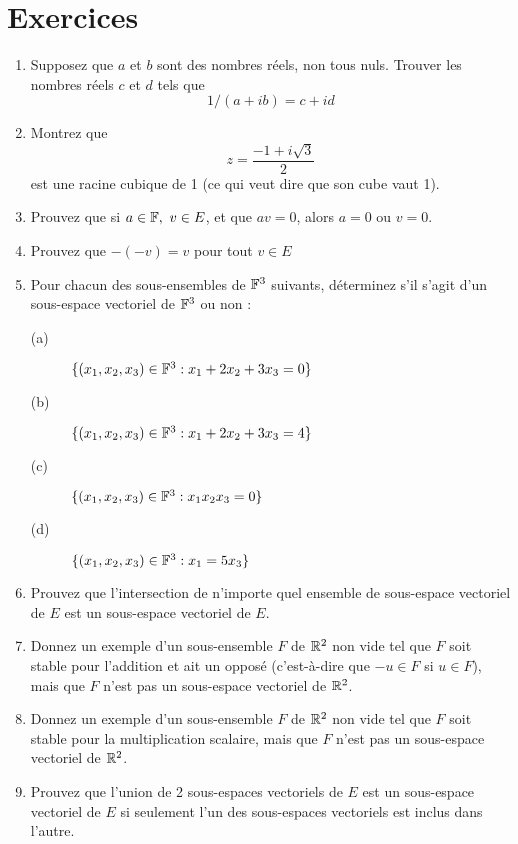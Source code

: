 \documentclass[12pt]{book}
\begin{document}
\section*{Exercices}

\begin{enumerate}
    \item Supposez que $a$ et $b$ sont des nombres réels, non tous nuls. Trouver les nombres réels $c$ et $d$ tels que
    \begin{equation*}
        1/(a+ib)=c+id
    \end{equation*}
    \item Montrez que
    \begin{equation*}
        z=\frac{-1+i\sqrt{3}}{2}
    \end{equation*}
    est une racine cubique de 1 (ce qui veut dire que son cube vaut 1).
    \item Prouvez que si $a\in\mathbb{F},~v\in E$, et que $av=0$, alors $a=0$ ou $v=0$.
    \item Prouvez que $-(-v)=v$ pour tout $v\in E$
    \item Pour chacun des sous-ensembles de $\mathbb{F}^3$ suivants, déterminez s'il s'agit d'un sous-espace vectoriel de $\mathbb{F}^3$ ou non :
    \begin{description}
        \item[(a)] $ \{(x_1,x_2,x_3)\in\mathbb{F}^3:x_1+2x_2+3x_3=0\} $
        \item[(b)] $ \{(x_1,x_2,x_3)\in\mathbb{F}^3:x_1+2x_2+3x_3=4\} $
        \item[(c)] $ \{(x_1,x_2,x_3)\in\mathbb{F}^3:x_1x_2x_3=0\} $
        \item[(d)] $ \{(x_1,x_2,x_3)\in\mathbb{F}^3:x_1=5x_3\} $
    \end{description}
    \item Prouvez que l'intersection de n'importe quel ensemble de sous-espace vectoriel de $E$ est un sous-espace vectoriel de $E$.
    \item Donnez un exemple d'un sous-ensemble $F$ de $\mathbb{R}^2$ non vide tel que $F$ soit stable pour l’addition et ait un opposé (c'est-à-dire que $-u\in F$ si $u\in F$), mais que $F$ n'est pas un sous-espace vectoriel de $\mathbb{R}^2$.
    \item Donnez un exemple d'un sous-ensemble $F$ de $\mathbb{R}^2$ non vide tel que $F$ soit stable pour la multiplication scalaire, mais que $F$ n'est pas un sous-espace vectoriel de $\mathbb{R}^2$.
    \item Prouvez que l'union de 2 sous-espaces vectoriels de $E$ est un sous-espace vectoriel de $E$ si seulement l'un des sous-espaces vectoriels est inclus dans l'autre.

\end{enumerate}
\end{document}
